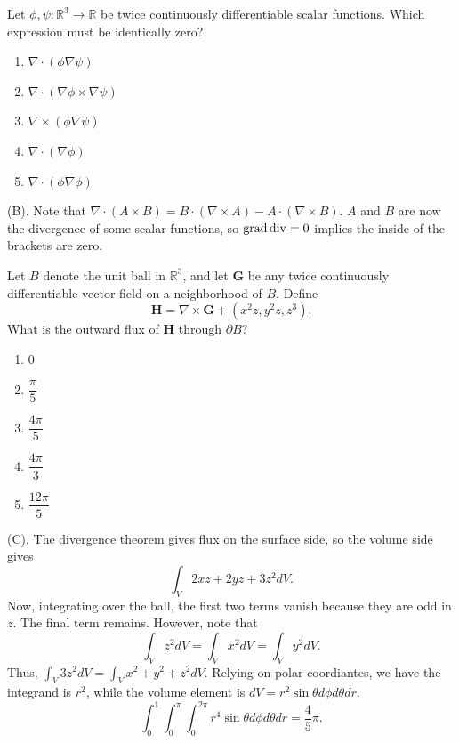 \begin{exercise}
Let $\phi,\psi:\mathbb R^3\to\mathbb R$ be twice continuously differentiable scalar functions.
Which expression must be identically zero?
\begin{enumerate}[label=(\Alph*)]
    \item $\nabla\cdot(\phi\nabla\psi)$
    \item $\nabla\cdot(\nabla\phi\times\nabla\psi)$
    \item $\nabla\times(\phi\nabla\psi)$
    \item $\nabla\cdot(\nabla\phi)$
    \item $\nabla\cdot(\phi\nabla\phi)$
\end{enumerate}
\end{exercise}
\begin{solution}
(B). Note that $\nabla \cdot (A \times B) = B \cdot (\nabla \times A) - A \cdot (\nabla \times B)$.
$A$ and $B$ are now the divergence of some scalar functions, so $\operatorname{grad} \operatorname{div} = 0$ implies the inside 
of the brackets are zero.
\end{solution}

\begin{exercise}
Let $B$ denote the unit ball in $\mathbb R^3$, and let $\mathbf G$ be any twice 
continuously differentiable vector field on a neighborhood of $B$. Define
\[
\mathbf H=\nabla\times\mathbf G+(x^2z,y^2z,z^3).
\]
What is the outward flux of $\mathbf H$ through $\partial B$?
\begin{enumerate}[label=(\Alph*)]
    \item $0$
    \item $\dfrac{\pi}{5}$
    \item $\dfrac{4\pi}{5}$
    \item $\dfrac{4\pi}{3}$
    \item $\dfrac{12\pi}{5}$
\end{enumerate}
\end{exercise}
\begin{solution}
(C). The divergence theorem gives flux on the surface side, so the volume side gives
\[
\int_V 2xz + 2yz + 3z^2 dV.
\]    
Now, integrating over the ball, the first two terms vanish because they are odd in $z$. The final term remains.
However, note that 
\[
\int_V z^2 dV = \int_V x^2 dV = \int_V y^2 dV.
\]
Thus, $\int_V 3z^2 dV = \int_V x^2 + y^2 + z^2 dV$. Relying on polar coordiantes, we have the 
integrand is $r^2$, while the volume element is $dV = r^2 \sin \theta d\phi d\theta dr$.
\[
\int_0^{1} \int_0^{\pi} \int_{0}^{2\pi} r^4 \sin \theta d \phi d\theta dr 
= \frac{4}{5}\pi.
\]
\end{solution}

